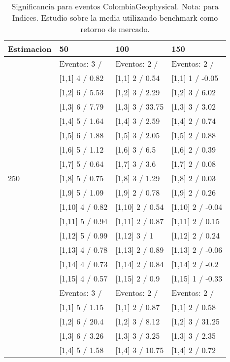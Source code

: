 \begin{table}

\caption{Significancia para eventos ColombiaGeophysical. Nota: para Indices. Estudio sobre la media utilizando benchmark como retorno de mercado.}
\centering
\begin{tabular}[t]{llll}
\toprule
Estimacion & 50 & 100 & 150\\
\midrule
 & Eventos:  3 / & Eventos:  2 / & Eventos:  2 /\\
 & {}[1,1] 4  / 0.82 & {}[1,1] 2  / 0.54 & {}[1,1] 1  / -0.05\\
 & {}[1,2] 6  / 5.53 & {}[1,2] 3  / 2.29 & {}[1,2] 3  / 6.02\\
 & {}[1,3] 6  / 7.79 & {}[1,3] 3  / 33.75 & {}[1,3] 3  / 3.02\\
 & {}[1,4] 5  / 1.64 & {}[1,4] 3  / 2.59 & {}[1,4] 2  / 0.74\\
\addlinespace
 & {}[1,5] 6  / 1.88 & {}[1,5] 3  / 2.05 & {}[1,5] 2  / 0.88\\
 & {}[1,6] 5  / 1.12 & {}[1,6] 3  / 6.5 & {}[1,6] 2  / 0.39\\
 & {}[1,7] 5  / 0.64 & {}[1,7] 3  / 3.6 & {}[1,7] 2  / 0.08\\
250 & {}[1,8] 5  / 0.75 & {}[1,8] 3  / 1.29 & {}[1,8] 2  / 0.03\\
 & {}[1,9] 5  / 1.09 & {}[1,9] 2  / 0.78 & {}[1,9] 2  / 0.26\\
\addlinespace
 & {}[1,10] 4  / 0.82 & {}[1,10] 2  / 0.54 & {}[1,10] 2  / -0.04\\
 & {}[1,11] 5  / 0.94 & {}[1,11] 2  / 0.87 & {}[1,11] 2  / 0.15\\
 & {}[1,12] 5  / 0.99 & {}[1,12] 3  / 1 & {}[1,12] 2  / 0.24\\
 & {}[1,13] 4  / 0.78 & {}[1,13] 2  / 0.89 & {}[1,13] 2  / -0.06\\
 & {}[1,14] 4  / 0.73 & {}[1,14] 2  / 0.84 & {}[1,14] 2  / -0.2\\
\addlinespace
 & {}[1,15] 4  / 0.57 & {}[1,15] 2  / 0.9 & {}[1,15] 1  / -0.33\\
 & Eventos:  3 / & Eventos:  2 / & Eventos:  2 /\\
 & {}[1,1] 5  / 1.15 & {}[1,1] 2  / 0.87 & {}[1,1] 2  / 0.58\\
 & {}[1,2] 6  / 20.4 & {}[1,2] 3  / 8.12 & {}[1,2] 3  / 31.25\\
 & {}[1,3] 6  / 3.26 & {}[1,3] 3  / 3.25 & {}[1,3] 3  / 2.35\\
\addlinespace
 & {}[1,4] 5  / 1.58 & {}[1,4] 3  / 10.75 & {}[1,4] 2  / 0.72\\

\end{tabular}
\end{table}
